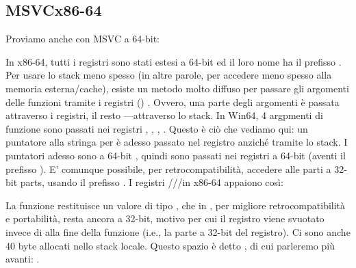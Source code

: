 \subsection{MSVC\EMDASH{}x86-64}

Proviamo anche con MSVC a 64-bit:




In x86-64, tutti i registri sono stati estesi a 64-bit ed il loro nome ha il prefisso .
Per usare lo stack meno spesso (in altre parole, per accedere meno spesso alla memoria esterna/cache), esiste un metodo molto diffuso per passare gli argomenti delle funzioni tramite i registri ()
.
Ovvero, una parte degli argomenti è passata attraverso i registri, il resto ---attraverso lo stack.
In Win64, 4 argpmenti di funzione sono passati nei registri \RCX, \RDX, , .
Questo è ciò che vediamo qui: un puntatore alla stringa per \printf è adesso passato nel registro \RCX anziché tramite lo stack.
I puntatori adesso sono a 64-bit , quindi sono passati nei registri a 64-bit (aventi il prefisso ).
E' comunque possibile, per retrocompatibilità, accedere alle parti a 32-bit parts, usando il prefisso .
I registri \RAX/\EAX/\AX/\AL in x86-64 appaiono così:


La funzione \main restituisce un valore di tipo \Tint{}, che in \CCpp, per migliore retrocompatibilità e portabilità, resta ancora a 32-bit, motivo per cui il registro \EAX viene svuotato invece di \RAX{} alla fine della funzione (i.e., la parte a 32-bit
del registro).
Ci sono anche 40 byte allocati nello stack locale.
Questo spazio è detto , di cui parleremo più avanti: .

